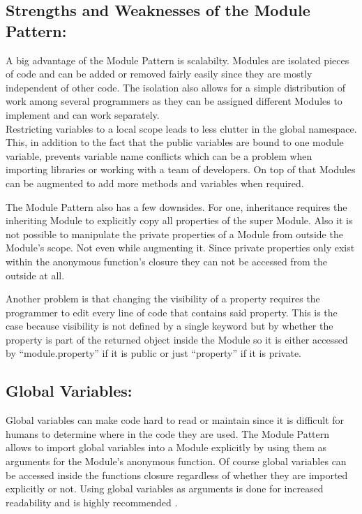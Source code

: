 \documentclass{bioinfo}
\begin{document}
\subsection{Strengths and Weaknesses of the Module Pattern:}
A big advantage of the Module Pattern is scalabilty. Modules are isolated pieces of code and can be added or removed fairly easily since they are mostly independent of other code. The isolation also allows for a simple distribution of work among several programmers as they can be assigned different Modules to implement and can work separately.\\

Restricting variables to a local scope leads to less clutter in the global namespace. This, in addition to the fact that the public variables are bound to one module variable, prevents variable name conflicts which can be a problem when importing libraries or working with a team of developers. On top of that Modules can be augmented to add more methods and variables when required.

The Module Pattern also has a few downsides. For one, inheritance requires the inheriting Module to explicitly copy all properties of the super Module. Also it is not possible to manipulate the private properties of a Module from outside the Module's scope. Not even while augmenting it. Since private properties only exist within the anonymous function's closure they can not be accessed from the outside at all. \vspace{\baselineskip}

Another problem is that changing the visibility of a property requires the programmer to edit every line of code that contains said property. This is the case because visibility is not defined by a single keyword but by whether the property is part of the returned object inside the Module so it is either accessed by ``module.property'' if it is public or just ``property'' if it is private.


\subsection{Global Variables:}
Global variables can make code hard to read or maintain since it is difficult for humans to determine where in the code they are used. The Module Pattern allows to import global variables into a Module explicitly by using them as arguments for the Module's anonymous function. Of course global variables can be accessed inside the functions closure regardless of whether they are imported explicitly or not. Using global variables as arguments is done for increased readability and is highly recommended \cite{adequatelygood}.\\
\end{document}

